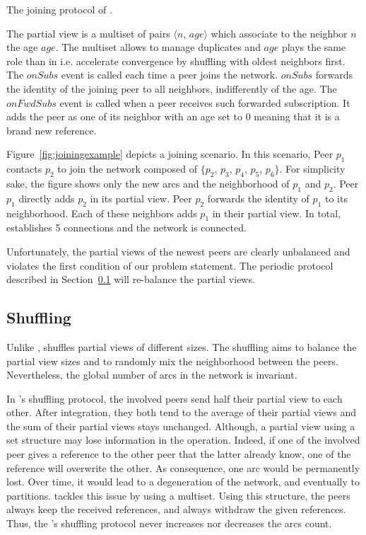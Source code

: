 \begin{algorithm}

\caption{\label{algo:joining}The joining protocol of \SPRAY.}
\end{algorithm}

The partial view is a multiset of pairs $\langle n,\, age\rangle$
which associate to the neighbor $n$ the age $age$. The multiset allows
to manage duplicates and $age$ plays the same role than in \CYCLON i.e.
accelerate convergence by shuffling with oldest neighbors first. The $onSubs$ event
is called each time a peer joins the network. $onSubs$ forwards the
identity of the joining peer to all neighbors, indifferently of the
age. The $onFwdSubs$ event is called when a peer receives such
forwarded subscription. It adds the peer as one of its neighbor with
an age set to $0$ meaning that it is a brand new reference.

Figure~\ref{fig:joiningexample} depicts a joining scenario. In this scenario,
Peer $p_1$ contacts $p_2$ to join the network composed of $\{p_2$, $p_3$,
$p_4$, $p_5$, $p_6\}$. For simplicity sake, the figure shows only the new arcs
and the neighborhood of $p_1$ and $p_2$. Peer $p_1$ directly adds $p_2$ in its
partial view. Peer $p_2$ forwards the identity of $p_1$ to its
neighborhood. Each of these neighbors adds $p_1$ in their partial view. In
total, \SPRAY establishes 5 connections and the network is connected.

Unfortunately, the partial views of the newest peers are clearly unbalanced and
violates the first condition of our problem statement. The periodic protocol
described in Section~\ref{subsec:cyclic} will re-balance the partial views.

\subsection{Shuffling}
\label{subsec:cyclic}

Unlike \CYCLON, \SPRAY shuffles partial views of different sizes. The shuffling
aims to balance the partial view sizes and to randomly mix the neighborhood
between the peers. Nevertheless, the global number of arcs in the network is
invariant.

In \SPRAY's shuffling protocol, the involved peers send half their partial view
to each other. After integration, they both tend to the average of their
partial views and the sum of their partial views stays unchanged. Although, a
partial view using a set structure may lose information in the
operation. Indeed, if one of the involved peer gives a reference to the other
peer that the latter already know, one of the reference will overwrite the
other. As consequence, one arc would be permanently lost. Over time, it would
lead to a degeneration of the network, and eventually to partitions. \SPRAY
tackles this issue by using a multiset. Using this structure, the peers always
keep the received references, and always withdraw the given references. Thus,
the \SPRAY's shuffling protocol never increases nor decreases the arcs count.

